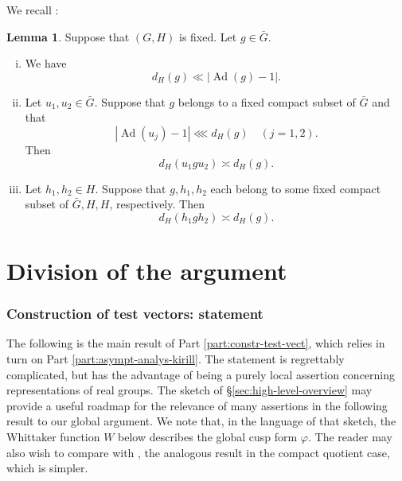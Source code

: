 \documentclass[reqno]{amsart}
\DeclareMathOperator{\Ad}{Ad}
\theoremstyle{plain} \newtheorem{theorem} {Theorem}
\theoremstyle{definition} \newtheorem{definition} [theorem] {Definition}
\theoremstyle{itplain} %
\newtheorem{lemma}[theorem]{Lemma}
\numberwithin{equation}{section}
\numberwithin{theorem}{section}
\begin{document}
We recall \cite[Lemma 4.1]{2020arXiv201202187N}:
\begin{lemma}
  Suppose that $(G,H)$ is fixed.  Let $g \in \bar{G}$.
  \begin{enumerate}[(i)]
  \item We have
    \begin{equation}\label{eqn:d-H-Z-vs-dist-G-mod-Z}
      d_{H}(g) \ll |\Ad(g)-1|.
    \end{equation}  
  \item
    Let $u_1, u_2 \in \bar{G}$.
    Suppose that $g$
    belongs to a fixed compact subset of $\bar{G}$
    and that
    \[
      |\Ad(u_j)-1| \lll
      d_{H}(g)
      \quad (j=1,2).
    \]
    Then
    \begin{equation}\label{eqn:d-H-Z-compare-u-g-g}
      d_{H}(u_1 g u_2) \asymp d_{H}(g).
    \end{equation}
  \item Let $h_1, h_2 \in H$.  Suppose that $g,h_1,h_2$
    each belong to some fixed compact subset of $\bar{G},H,H$, respectively.  Then
    \begin{equation}\label{eqn:d-H-h1gh2}
      d_{H}(h_1 g h_2)
      \asymp d_{H}(g).
    \end{equation}
  \end{enumerate}
\end{lemma}





\part{Division of the argument}\label{part:reduction-proof}



\section{Construction of test vectors: statement}\label{sec:20230516081722}
The following is the main result of Part \ref{part:constr-test-vect}, which relies in turn on Part \ref{part:asympt-analys-kirill}.  The statement is regrettably complicated, but has the advantage of being a purely local assertion concerning representations of real groups.  The sketch of \S\ref{sec:high-level-overview} may provide a useful roadmap for the relevance of many assertions in the following result to our global argument.  We note that, in the language of that sketch, the Whittaker function $W$ below describes the global cusp form $\varphi$.  The reader may also wish to compare with \cite[Thm 4.2]{2020arXiv201202187N}, the analogous result in the compact quotient case, which is simpler.
\end{document}
